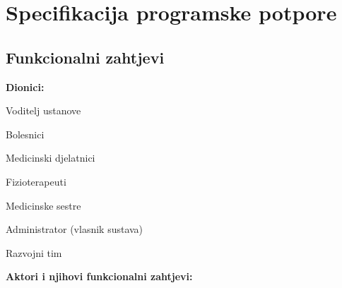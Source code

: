 \chapter{Specifikacija programske potpore}
		
	\section{Funkcionalni zahtjevi}
			
			
				
		
			
			\noindent \textbf{Dionici:}
			
			\begin{packed_enum}
				
				\item Voditelj ustanove
				\item Bolesnici				
				\item Medicinski djelatnici
				\begin{packed_enum}
					\item Fizioterapeuti
					\item Medicinske sestre
				\end{packed_enum}
				\item Administrator (vlasnik sustava)
				\item Razvojni tim
				
			\end{packed_enum}
			
			\noindent \textbf{Aktori i njihovi funkcionalni zahtjevi:}
			
